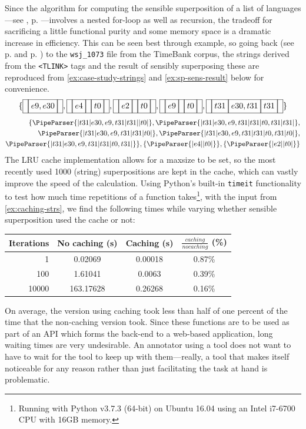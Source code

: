 \documentclass[a4paper,12pt,leqno]{article}
\newcommand{\vph}[1]{\vphantom{#1}}
\newcommand{\ebox}[1]{\fbox{$\vph{'(),}#1$}}
\newcommand{\nbBefore}[2]{\ebox{#1}\ebox{}\ebox{#2}}
\newcommand{\nbDuring}[2]{\ebox{#2}\ebox{#1,#2}\ebox{#2}}
\newcommand{\nbEquals}[2]{\ebox{#1,#2}}
\newcommand{\Before}[2]{\ebox{}\nbBefore{#1}{#2}\ebox{}}
\newcommand{\During}[2]{\ebox{}\nbDuring{#1}{#2}\ebox{}}
\newcommand{\Equals}[2]{\ebox{}\nbEquals{#1}{#2}\ebox{}}
\newcommand{\EventString}[1]{%
	\renewcommand*{\do}[1]{\ebox{##1}}%
	\PipeParser{#1}%
}
\begin{document}
Since the algorithm for computing the sensible superposition of a list of languages---see , p. \pageref{fig:pseudo-code-spsens}---involves a nested for-loop as well as recursion, the tradeoff for sacrificing a little functional purity and some memory space is a dramatic increase in efficiency. This can be seen best through example, so going back (see p. \pageref{fig:case-study-tlinks} and p. \pageref{ex:validate-wsj}) to the \verb|wsj_1073| file from the TimeBank corpus, the strings derived from the \verb|<TLINK>| tags and the result of sensibly superposing these are reproduced from \cref{ex:case-study-strings} and \cref{ex:sp-sens-result} below for convenience.
\begin{align}
	\{\Equals{e9}{e30}, \Before{e4}{t0}, \Before{e2}{t0}, \Before{e9}{t0}, \During{e30}{t31}\}\label{ex:caching-strs}
\end{align}
\begin{align}
	\{\EventString{{}|t31|e30,e9,t31|t31|{}|t0|{}}, \EventString{{}|t31|e30,e9,t31|t31|t0,t31|t31|{}},\\
	\EventString{{}|t31|e30,e9,t31|t31|t0|{}}, \EventString{{}|t31|e30,e9,t31|t31|t0,t31|t0|{}},\notag\\
	\EventString{{}|t31|e30,e9,t31|t31|t0,t31|{}}\}, \{\EventString{{}|e4|{}|t0|{}}\}, \{\EventString{{}|e2|{}|t0|{}}\}\notag
\end{align}
The LRU cache implementation allows for a maxsize to be set, so the most recently used 1000 (string) superpositions are kept in the cache, which can vastly improve the speed of the calculation. Using Python's built-in \verb|timeit| functionality to test how much time repetitions of a function takes\footnote{Running with Python v3.7.3 (64-bit) on Ubuntu 16.04 using an Intel i7-6700 CPU with 16GB memory.}, with the input from \cref{ex:caching-strs}, we find the following times while varying whether sensible superposition used the cache or not:
\begin{center}
	\footnotesize
	\begin{tabular}[h!]{|r|c  c  c|}
		\hline
		\textbf{Iterations} & \textbf{No caching (s)} & \textbf{Caching (s)} & $\frac{caching}{no caching}$ (\%)\\
		\hline
		1 & 0.02069 & 0.00018 & 0.87\%\\
		100 & 1.61041 & 0.0063 & 0.39\%\\%
		10000 & 163.17628 & 0.26268 & 0.16\%\\%
		\hline
	\end{tabular}
\end{center}
On average, the version using caching took less than half of one percent of the time that the non-caching version took. Since these functions are to be used as part of an API which forms the back-end to a web-based application, long waiting times are very undesirable. An annotator using a tool does not want to have to wait for the tool to keep up with them---really, a tool that makes itself noticeable for any reason rather than just facilitating the task at hand is problematic.
\end{document}
